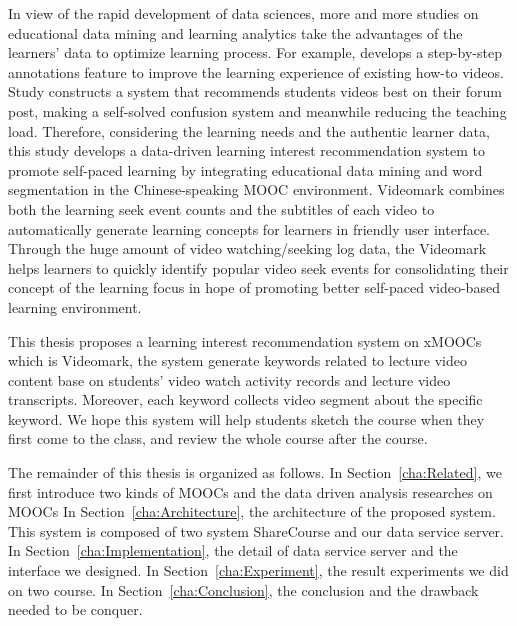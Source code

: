 In view of the rapid development of data sciences,
more and more studies on educational data mining and learning analytics take the advantages of the learners’ data to optimize learning process.
For example, \cite{kim2014} develops a step-by-step annotations feature to improve the learning experience of existing how-to videos.
Study \cite{agrawal2015} constructs a system that recommends students videos best on their forum post, making a self-solved confusion system and meanwhile reducing the teaching load.
Therefore, considering the learning needs and the authentic learner data,
this study develops a data-driven learning interest recommendation system to promote self-paced learning by integrating educational data mining and word segmentation in the Chinese-speaking MOOC environment.
Videomark combines both the learning seek event counts and the subtitles of each video to automatically generate learning concepts for learners in friendly user interface.
Through the huge amount of video watching/seeking log data, the Videomark helps learners to quickly identify popular video seek events for consolidating their concept of the learning focus in hope of promoting better self-paced video-based learning environment.

This thesis proposes a learning interest recommendation system on xMOOCs which is Videomark, the system generate keywords related to lecture video content base on students' video watch activity records and lecture video transcripts.
Moreover, each keyword collects video segment about the specific keyword.
We hope this system will help students sketch the course when they first come to the class,
and review the whole course after the course.

The remainder of this thesis is organized as follows.
In Section~\ref{cha:Related}, we first introduce two kinds of MOOCs and the data driven analysis researches on MOOCs
In Section~\ref{cha:Architecture}, the architecture of the proposed system. This system is composed of two system ShareCourse \cite{sharecourse} and our data service server.
In Section~\ref{cha:Implementation}, the detail of data service server and the interface we designed.
In Section~\ref{cha:Experiment}, the result experiments we did on two course.
In Section~\ref{cha:Conclusion}, the conclusion and the drawback needed to be conquer.
